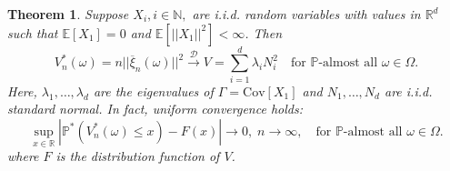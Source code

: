 \documentclass[sn-mathphys,Numbered]{sn-jnl}%
\theoremstyle{thmstyleone}%
\newtheorem{theorem}{Theorem}%
\theoremstyle{thmstyletwo}%
\theoremstyle{thmstylethree}%
\begin{document}
\begin{theorem} \label{bootstrapfinite} Suppose $X_i, i \in \mathbb{N},$ are i.i.d. random variables with values in $\mathbb{R}^d$ such that
$\mathbb{E}[X_1]=0$ and  $\mathbb{E}[||X_1||^2] < \infty$. Then
\begin{equation} \label{bootstrapconv}
 V_n^*(\omega)= n ||\overline{\xi}_n(\omega)||^2 \stackrel{\mathcal{D}}{\rightarrow} V=\sum_{i=1}^d \lambda_i N_i^2 \quad \text{for } \mathbb{P}\text{-almost all } \omega \in \Omega.
\end{equation}
Here, $\lambda_1,\dots,\lambda_d$ are the eigenvalues of $\Gamma = \text{Cov}[X_1]$ and $N_1,\ldots,N_d$ are i.i.d. standard normal. In fact, uniform convergence holds:
\begin{equation} \label{uniformVnstar}
  \sup_{x \in \mathbb{R}}|\mathbb{P}^*(V_n^*(\omega) \le x)-F(x)| \rightarrow 0, \;  n \rightarrow \infty,\quad \text{for } \mathbb{P}\text{-almost all } \omega \in \Omega.
\end{equation}
where $F$ is the distribution function of $V$.
\end{theorem}
\end{document}

